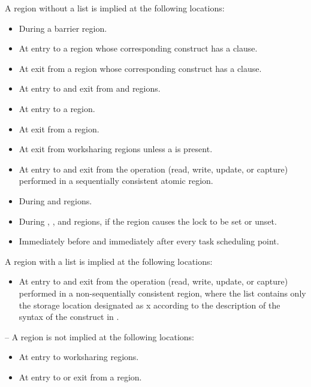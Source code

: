 A  region without a list is implied at the following locations:
\begin{itemize}
\item During a barrier region.
\item At entry to a  region whose corresponding construct has a  clause.
\item At exit from a  region whose corresponding construct has a  clause.
\item At entry to and exit from  and  regions.
\item At entry to a  region. 
\item At exit from a  region. 
\item At exit from worksharing regions unless a  is present.
\item At entry to and exit from the  operation (read, write, update, or capture) 
performed in a sequentially consistent atomic region.
\item During  and  regions.
\item During , ,  
and  regions, if the region causes the lock to be set or unset.
\item Immediately before and immediately after every task scheduling point.
\end{itemize}

A  region with a list is implied at the following locations:
\begin{itemize}
\item At entry to and exit from the  operation (read, write, update, or capture) 
performed in a non-sequentially consistent  region, where the list contains 
only the storage location designated as x according to the description of the syntax of 
the  construct in 
.
\end{itemize}

\notestart
\noteheader – A  region is not implied at the following locations:

\begin{itemize}
\item At entry to worksharing regions.

\item At entry to or exit from a  region.
\end{itemize}
\noteend










